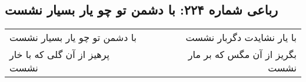 \begin{center}
\section*{رباعی شماره ۲۲۴: با دشمن تو چو یار بسیار نشست}
\label{sec:0224}
\begin{longtable}{l p{0.5cm} r}
با دشمن تو چو یار بسیار نشست
&&
با یار نشایدت دگربار نشست
\\
پرهیز از آن گلی که با خار نشست
&&
بگریز از آن مگس که بر مار نشست
\\
\end{longtable}
\end{center}
